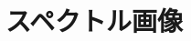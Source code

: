 \documentclass[../main]{subfiles}
\begin{document}
\graphicspath{{../figures/chap2/}}

\section{スペクトル画像}
\label{sec:the_sp_image}
\end{document}
